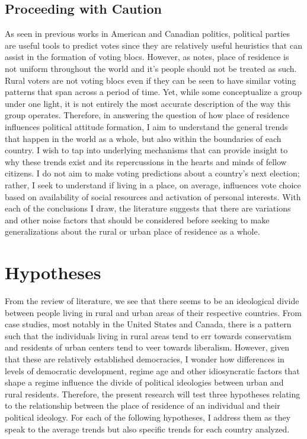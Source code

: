 \documentclass[12pt, titlepage]{article}
\begin{document}
\subsection{Proceeding with Caution}

As seen in previous works in American and Canadian politics, political parties are useful tools to predict votes since they are relatively useful heuristics that can assist in the formation of voting blocs. However, as \cite{holloway_burning_2007} notes, place of residence is not uniform throughout the world and it's people should not be treated as such. Rural voters are not voting blocs even if they can be seen to have similar voting patterns that span across a period of time. Yet, while some conceptualize a group under one light, it is not entirely the most accurate description of the way this group operates. Therefore, in answering the question of how place of residence influences political attitude formation, I aim to understand the general trends that happen in the world as a whole, but also within the boundaries of each country. I wish to tap into underlying mechanisms that can provide insight to why these trends exist and its repercussions in the hearts and minds of fellow citizens. I do not aim to make voting predictions about a country's next election; rather, I seek to understand if living in a place, on average, influences vote choice based on availability of social resources and activation of personal interests. With each of the conclusions I draw, the literature suggests that there are variations and other noise factors that should be considered before seeking to make generalizations about the rural or urban place of residence as a whole.

\section{Hypotheses}

From the review of literature, we see that there seems to be an ideological divide between people living in rural and urban areas of their respective countries. From case studies, most notably in the United States and Canada, there is a pattern such that the individuals living in rural areas tend to err towards conservatism and residents of urban centers tend to veer towards liberalism. However, given that these are relatively established democracies, I wonder how differences in levels of democratic development, regime age and other idiosyncratic factors that shape a regime influence the divide of political ideologies between urban and rural residents. Therefore, the present research will test three hypotheses relating to the relationship between the place of residence of an individual and their political ideology. For each of the following hypotheses, I address them as they speak to the average trends but also specific trends for each country analyzed.
\end{document}
